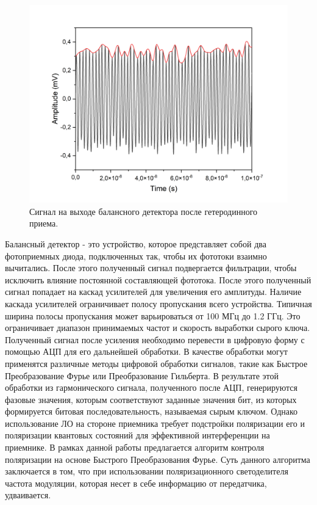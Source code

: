 \begin{figure}
    \centering
    \includegraphics[width=\textwidth]{images/balanced output heterodyne.png}
    \caption{Сигнал на выходе балансного детектора после гетеродинного приема.}
    \label{fig:het time output}
\end{figure}
\newline Балансный детектор - это устройство, которое представляет собой два фотоприемных диода, подключенных так, чтобы их фототоки взаимно вычитались. После этого полученный сигнал подвергается фильтрации, чтобы исключить влияние постоянной составляющей фототока. После этого полученный сигнал попадает на каскад усилителей для увеличения его амплитуды. Наличие каскада усилителей ограничивает полосу пропускания всего устройства. Типичная ширина полосы пропускания может варьироваться от 100 МГц до 1.2 ГГц. Это ограничивает диапазон принимаемых частот и скорость выработки сырого ключа. 
\newline Полученный сигнал после усиления необходимо перевести в цифровую форму с помощью АЦП для его дальнейшей обработки. В качестве обработки могут применятся различные методы цифровой обработки сигналов, такие как Быстрое Преобразование Фурье или Преобразование Гильберта. В результате этой обработки из гармонического сигнала, полученного после АЦП, генерируются фазовые значения, которым соответствуют заданные значения бит, из которых формируется битовая последовательность, называемая сырым ключом. 
Однако использование ЛО на стороне приемника требует подстройки поляризации его и поляризации квантовых состояний для эффективной интерференции на приемнике. В рамках данной работы предлагается алгоритм контроля поляризации на основе Быстрого Преобразования Фурье. Суть данного алгоритма заключается в том, что при использовании поляризационного светоделителя частота модуляции, которая несет в себе информацию от передатчика, удваивается.

